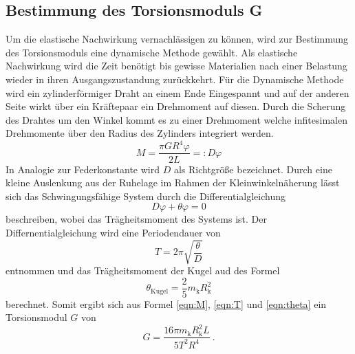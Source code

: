 \subsection{Bestimmung des Torsionsmoduls G}
Um die elastische Nachwirkung vernachlässigen zu können, wird zur Bestimmung des Torsionsmoduls eine dynamische Methode gewählt. Als elastische Nachwirkung wird die Zeit benötigt bis gewisse Materialien nach einer Belastung wieder in ihren Ausgangszustandung zurückkehrt. 
Für die Dynamische Methode wird ein zylinderförmiger Draht an einem Ende Eingespannt und auf der anderen Seite wirkt über ein Kräftepaar ein Drehmoment auf diesen. Durch die Scherung des Drahtes um den Winkel \alpha kommt es zu einer Drehmoment welche infitesimalen Drehmomente über den Radius des Zylinders  integriert werden. 
\begin{equation}
  M = \frac{\pi G R^4 \varphi}{2L} =: D \varphi
  \label{eqn:M}
\end{equation}
In Analogie zur Federkonstante wird $D$ als Richtgröße bezeichnet. Durch eine kleine Auslenkung aus der Ruhelage im Rahmen der Kleinwinkelnäherung lässt sich das Schwingungsfähige System durch die Differentialgleichung 
\begin{equation}
  D \varphi + \theta \varphi = 0
  \label{eqn:dgl}
\end{equation}
beschreiben, wobei \theta das Trägheitsmoment des Systems ist. Der Differnentialgleichung wird eine Periodendauer von 
\begin{equation}
  T = 2 \pi \sqrt{\frac{\theta}{D}}
  \label{eqn:T}
\end{equation}
entnommen und das Trägheitsmoment der Kugel aud des Formel 
\begin{equation}
  \theta_\text{Kugel} = \frac{2}{5}m_\text{k}R_\text{k}^2
  \label{eqn:theta}
\end{equation}
berechnet. Somit ergibt sich aus Formel \ref{eqn:M}, \ref{eqn:T} und \ref{eqn:theta} ein Torsionsmodul $G$ von 
\begin{equation}
  G = \frac{16 \pi m_\text{k} R_\text{k}^2 L}{5 T^2 R^4} \ .
  \label{eqn:G}
\end{equation}
